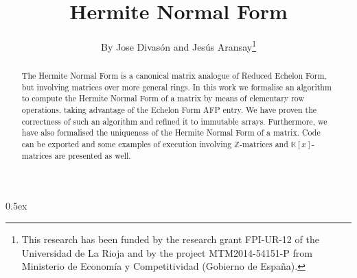 \documentclass[11pt,a4paper]{article}
\begin{document}
\title{Hermite Normal Form}
\author{By Jose Divas\'on and Jes\'us Aransay\thanks{This research has been funded 
  by the research grant FPI-UR-12 of the Universidad de La Rioja and by the project MTM2014-54151-P from Ministerio de Econom\'ia y Competitividad
(Gobierno de Espa\~na).}}
\maketitle

\begin{abstract}
The Hermite Normal Form is a canonical matrix analogue of Reduced Echelon Form, but involving matrices over more general rings.
In this work we formalise an algorithm to compute the Hermite Normal Form of a matrix by means of elementary row operations, 
taking advantage of the Echelon Form AFP entry. We have proven the correctness of such an algorithm and refined it to immutable arrays.
Furthermore, we have also formalised the uniqueness of the Hermite Normal Form of a matrix.
Code can be exported and some examples of execution involving $\mathbb{Z}$-matrices and $\mathbb{K}[x]$-matrices are presented as well.
\end{abstract}

\tableofcontents

\parindent 0pt\parskip 0.5ex


\end{document}
